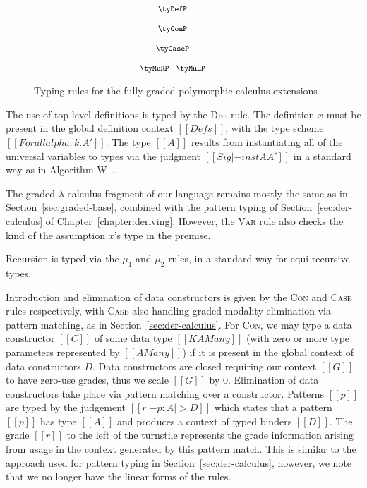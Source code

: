 \begin{figure}[t]
    \begin{align*}
    {\footnotesize{
    \hspace{-2.5em}
    \begin{array}{c}
    \tyDefP
        \\[1.25em]
    \tyConP
        \\[1.25em]
    \tyCaseP
        \\[1.25em]
    \tyMuRP
    \;\;\;
    \tyMuLP
    \end{array}
    }}
    \end{align*}
    \caption{Typing rules for the fully graded polymorphic calculus extensions}
    \label{fig:typing-graded-poly2}
\end{figure}
The use of top-level definitions is typed by the \textsc{Def} rule. The
definition $x$ must be present in the global definition context $[[ Defs ]]$,
with the type scheme $[[  Forall alpha : k . A' ]]$. The type $[[ A ]]$ results
from instantiating all of the universal variables to types via the judgment $[[
Sig |- inst A A' ]]$ in a standard way as in Algorithm
W~\citep{milner1978theory}.

The graded $\lambda$-calculus fragment of our language remains mostly the same
as in Section~\ref{sec:graded-base}, combined with the pattern typing of
Section~\ref{sec:der-calculus} of Chapter~\ref{chapter:deriving}. However,
the \textsc{Var} rule also checks the kind of the assumption $x$'s type in the
premise.  

Recursion is typed via the $\mu_1$ and $\mu_2$ rules, in a standard
way for equi-recursive types.

Introduction and elimination of data constructors is given by the \textsc{Con}
and \textsc{Case} rules respectively, with \textsc{Case} also handling graded
modality elimination via pattern matching, as in
Section~\ref{sec:der-calculus}. For \textsc{Con}, we may type a data
constructor $[[C]]$ of some data type $[[ K {A Many} ]]$ (with zero or more type
parameters represented by $[[ {A Many} ]]$) if it is present in the global
context of data constructors $D$. Data constructors are closed requiring our
context $[[ G ]]$ to have zero-use grades, thus we scale $[[G]]$ by $0$.
Elimination of data constructors take place via pattern matching over a
constructor. Patterns $[[p]]$ are typed by the judgement $[[ r |- p : A |> D ]]$
which states that a pattern $[[p]]$ has type $[[A]]$ and produces a context of
typed binders $[[D]]$. The grade $[[r]]$ to the left of the turnstile represents
the grade information arising from usage in the context generated by this
pattern match. This is similar to the approach used for pattern typing in
Section~\ref{sec:der-calculus}, however, we note that we no longer have the
linear forms of the rules. 

